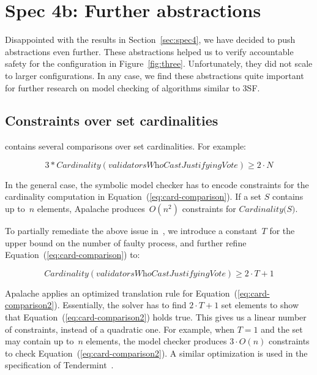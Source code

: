 
\section{Spec 4b: Further abstractions}

Disappointed with the results in Section~\ref{sec:spec4}, we have decided to
push abstractions even further. These abstractions helped us to verify
accountable safety for the configuration in Figure~\ref{fig:three}.
Unfortunately, they did not scale to larger configurations. In any case, we
find these abstractions quite important for further research on model checking
of algorithms similar to 3SF\@.

\subsection{Constraints over set cardinalities}

\SpecThree{} contains several comparisons over set cardinalities. For example:

\begin{equation}
    3 * \textit{Cardinality}(\textit{validatorsWhoCastJustifyingVote}) \ge 2 \cdot N
    \label{eq:card-comparison}
\end{equation}

In the general case, the symbolic model checker has to encode constraints for
the cardinality computation in Equation~(\ref{eq:card-comparison}). If a set
$S$ contains up to~$n$ elements, Apalache produces~$O(n^2)$ constraints for
$\textit{Cardinality(S)}$.

To partially remediate the above issue in~\SpecFour{}, we introduce a
constant~$T$ for the upper bound on the number of faulty process, and further
refine Equation~(\ref{eq:card-comparison}) to:

\begin{equation}
    \textit{Cardinality}(\textit{validatorsWhoCastJustifyingVote}) \ge 2 \cdot T + 1
    \label{eq:card-comparison2}
\end{equation}

Apalache applies an optimized translation rule for
Equation~(\ref{eq:card-comparison2}). Essentially, the solver has to find $2
\cdot T + 1$ set elements to show that Equation~(\ref{eq:card-comparison2})
holds true. This gives us a linear number of constraints, instead of a
quadratic one. For example, when $T=1$ and the set may contain up to~$n$
elements, the model checker produces $3 \cdot O(n)$ constraints to check
Equation~(\ref{eq:card-comparison2}). A similar optimization is used in the
specification of Tendermint~\cite{TendermintSpec2020}.

